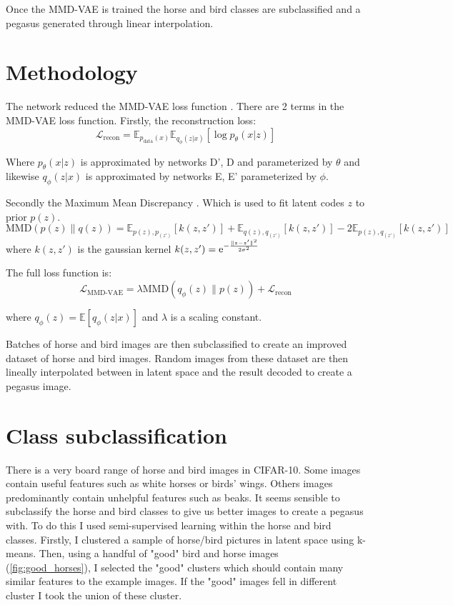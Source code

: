 \documentclass{article}
\begin{document}
Once the MMD-VAE is trained the horse and bird classes are subclassified and a pegasus generated through linear interpolation.

\section{Methodology}
The network reduced the MMD-VAE loss function \cite{infovae}. 
There are 2 terms in the MMD-VAE loss function. Firstly, the reconstruction loss:
\begin{equation}
    \mathcal{L}_{\textrm{recon}} = \mathbb{E}_{p_{\textrm{data}}(x)} \mathbb{E}_{q_\phi (z|x)} [\log p_\theta(x|z)]
\end{equation}

Where $p_\theta(x|z)$ is approximated by networks D', D and parameterized by $\theta$ and likewise $q_\phi(z|x)$ is approximated by networks E, E' parameterized by $\phi$.


Secondly the Maximum Mean Discrepancy \cite{mmd}. Which is used to fit latent codes $z$ to prior $p(z)$.
\begin{equation}
    \textrm{MMD}(p(z) \lVert q(z)) = \mathbb{E}_{p(z), p_(z')}[k(z, z')] + \mathbb{E}_{q(z), q_(z')}[k(z, z')] - 2 \mathbb{E}_{p(z), q_(z')}[k(z, z')]
\end{equation}
where $k(z, z')$ is the gaussian kernel $k(z, z')={\rm e}^{-\frac{\lVert z-z' \rVert^2}{2\sigma^2}}$

The full loss function is:
\begin{equation}
    \mathcal{L}_\textrm{MMD-VAE} = \lambda \textrm{MMD}(q_\phi (z) \lVert p(z)) + \mathcal{L}_{\textrm{recon}}
\end{equation}

where $q_\phi(z) =  \mathbb{E}[q_\phi(z|x)]$ and $\lambda$ is a scaling constant.

Batches of horse and bird images are then subclassified to create an improved dataset of horse and bird images. Random images from these dataset are then lineally interpolated between in latent space and the result decoded to create a pegasus image. 

\section{Class subclassification}
There is a very board range of horse and bird images in CIFAR-10. Some images contain useful features such as white horses or birds' wings. Others images predominantly contain unhelpful features such as beaks. It seems sensible to subclassify the horse and bird classes to give us better images to create a pegasus with. To do this I used semi-supervised learning within the horse and bird classes. Firstly, I clustered a sample of horse/bird pictures in latent space using k-means. Then, using a handful of "good" bird and horse images (\ref{fig:good_horses}), I selected the "good" clusters which should contain many similar features to the example images. If the "good" images fell in different cluster I took the union of these cluster.
\end{document}
